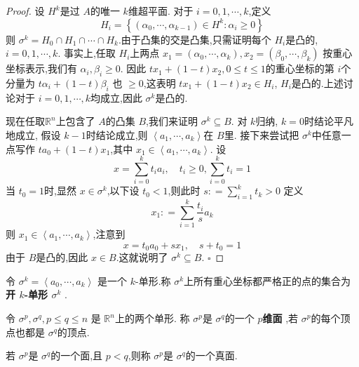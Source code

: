 \documentclass[../../几何与拓扑.tex]{subfiles}
\begin{document}
\begin{proof}
    设 \(  H^{k}  \)是过 \(  A  \)的唯一 \(  k  \)维超平面.   
    对于 \(  i= 0, 1,\cdots,k   \),定义 \[
    H_{i} =  \left\{ \left(   \alpha_0,\cdots,\alpha_{k-1}  \right) \in H^{k}:  \alpha _{i}\ge 0  \right\}
    \] 则 \(   \sigma ^{k} =  H_0\cap H_1\cap \cdots \cap H_{k}  \).由于凸集的交是凸集,只需证明每个 \(  H_{i}  \)是凸的, \(  i = 0, 1,\cdots,k   \).
    事实上,任取 \(  H_{i}  \)上两点 \(  x_1= \left(  \alpha _0 ,\cdots , \alpha_{k} \right),x_2 = \left( \beta _0 ,\cdots ,\beta _{k} \right)    \)  按重心坐标表示,我们有 \(   \alpha _{i}, \beta _{i}\ge 0  \).
    因此 \(  tx_1+ \left( 1-t \right)x_2, 0\le t\le 1   \)的重心坐标的第 \(  i  \)个分量为 \( t \alpha _{i}+\left( 1-t \right)\beta _{i}   \)       也 \(  \ge 0  \),这表明 
    \(  tx_1+ \left( 1-t \right)x_2 \in  H_{i}   \), \(  H_{i}  \)是凸的.上述讨论对于 \(  i= 0, 1,\cdots,k   \)均成立,因此 \(   \sigma ^{k}  \)是凸的.     


   现在任取\(  \mathbb{R} ^{n}  \)上包含了 \(  A  \)的凸集 \(  B  \),我们来证明 \( \sigma ^{k}\subseteq B  \).    对 \(  k  \)归纳, \(  k= 0  \)时结论平凡地成立, 假设 \(  k-1  \)时结论成立,则 \(  \left<a_1,\cdots ,a_{k} \right>  \)在 \(  B  \)里. 接下来尝试把
    \(   \sigma ^{k}  \)中任意一点写作 \(  ta_0+ \left( 1-t \right) x_1   \),其中 \(  x_1 \in  \left< a_1,\cdots,a_k  \right>  \). 设 \[
    x =  \sum _{i= 0}^{k} t_{i}a_{i},\quad  t_{i}\ge 0,\sum _{i= 0}^{k}t_{i}= 1
    \]  当 \(  t_0= 1  \)时,显然 \(  x \in  \sigma ^{k}  \),以下设 \(  t_0<1  \),则此时 \(  s: =  \sum _{i= 1}^{k}t_{k}>0  \)  
    定义 \[
    x_1: =  \sum _{i= 1}^{k} \frac{t_{i} }{ s} a_{k} 
    \]  则 \(  x_1 \in \left< a_1,\cdots,a_k  \right>  \),注意到 \[
    x =  t_0a_0+ sx_1,\quad  s + t_0= 1
    \] 由于 \(  B  \)是凸的,因此 \(  x \in B  \).这就说明了 \(   \sigma ^{k} \subseteq B  \).   
    \hfill $\square$
\end{proof}

\begin{definition}
    令 \(   \sigma ^{k} =  \left< a_0,\cdots,a_{k}  \right>  \) 是一个 \(  k  \)-单形.称 \(   \sigma ^{k}  \)上所有重心坐标都严格正的点的集合为 \textbf{开 \(  k  \)-单形 \(   \sigma ^{k}  \) }.  
\end{definition}


\begin{definition}
    令 \( \sigma ^{p}, \sigma ^{q}, p\le q\le n  \) 是 \(  \mathbb{R} ^{n}  \)上的两个单形.
    称 \(   \sigma ^{p}  \)是 \(   \sigma ^{q}  \)的一个 \textbf{\(  p  \)维面 },若 \(   \sigma ^{p}  \)的每个顶点也都是 \(   \sigma ^{q}  \)的顶点.
    
    若 \(   \sigma ^{p}  \)是 \(   \sigma ^{q}  \)的一个面,且 \(  p< q  \),则称 \(   \sigma ^{p}  \)是 \(   \sigma ^{q}  \)的一个真面.     
\end{definition}
\end{document}
